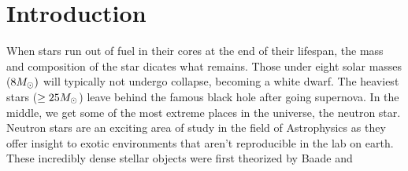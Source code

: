 \section{Introduction}
When stars run out of fuel in their cores at the end of their lifespan, the mass and composition of the star dicates what remains. Those under eight solar masses ($8M_\odot)$ will typically not undergo collapse, becoming a white dwarf. The heaviest stars ($\geq 25M_\odot$) leave behind the famous black hole after going supernova\cite{Heger2003}. In the middle, we get some of the most extreme places in the universe, the neutron star. Neutron stars are an exciting area of study in the field of Astrophysics as they offer insight to exotic environments that aren't reproducible in the lab on earth.   These incredibly dense stellar objects were first theorized by Baade and 